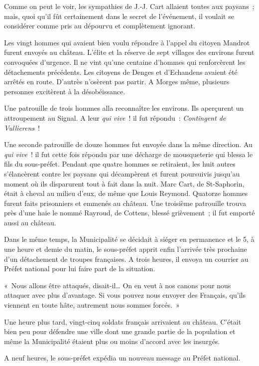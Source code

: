 \documentclass[french,twoside]{book} %
\newenvironment{quoteblock}%
  {\begin{quoting}}
  {\end{quoting}}
\newenvironment{quotebar}{%
    \def\FrameCommand{{\color{rubric!10!}\vrule width 0.5em} \hspace{0.9em}}%
    \def\OuterFrameSep{\itemsep} %
    \MakeFramed {\advance\hsize-\width \FrameRestore}
  }%
  {%
    \endMakeFramed
  }
\renewenvironment{quoteblock}%
  {%
    \savenotes
    \setstretch{0.9}
    \normalfont
    \begin{quotebar}
  }
  {%
    \end{quotebar}
    \spewnotes
  }
\begin{document}
\noindent Comme on peut le voir, les sympathies de J.-J. Cart allaient toutes aux paysans ; mais, quoi qu’il fût certainement dans le secret de l’événement, il voulait se considérer comme pris au dépourvu et complètement ignorant.\par
Les vingt hommes qui avaient bien voulu répondre à l’appel du citoyen Mandrot furent envoyés au château. L’élite et la réserve de sept villages des environs furent convoquées d’urgence. Il ne vint qu’une centaine d’hommes qui renforcèrent les détachements précédents. Les citoyens de Denges et d’Echandens avaient été arrêtés en route. D’autrès n’osèrent pas partir. A Morges même, plusieurs personnes excitèrent à la désobéissance.\par
Une patrouille de trois hommes alla reconnaître les environs. Ils aperçurent un attroupement au Signal. A leur \emph{qui vive} ! il fut répondu : \emph{Contingent de Vullierens} !\par
Une seconde patrouille de douze hommes fut envoyée dans la même direction. Au \emph{qui vive} ! il fut cette fois répondu par une décharge de mousqueterie qui blessa le fils du sous-préfet. Pendant que quatre hommes se retiraient, les huit autres s’élancèrent contre les paysans qui décampèrent et furent poursuivis jusqu’au moment où ils disparurent tout à fait dans la nuit. Marc Cart, de St-Saphorin, était à cheval au milieu d’eux, de même que Louis Reymond. Quatorze hommes furent faits prisonniers et emmenés au château. Une troisième patrouille trouva près d’une haie le nommé Rayroud, de Cottens, blessé grièvement ; il fut emporté aussi au château.\par
Dans le même temps, la Municipalité se décidait à siéger en permanence et le 5, à une heure et demie du matin, le sous-préfet apprit enfin l’arrivée très prochaine d’un détachement de troupes françaises. A trois heures, il envoya un courrier au Préfet national pour lui faire part de la situation.\par

\begin{quoteblock}
 \noindent « Nous allons être attaqués, disait-il… On en veut à nos canons pour nous attaquer avec plus d’avantage. Si vous pouvez nous envoyer des Français, qu’ils viennent en toute hâte, autrement nous sommes forcés. »
 \end{quoteblock}

\noindent Une heure plus tard, vingt-cinq soldats français arrivaient au château. C’était bien peu pour défendre une ville dont une grande partie de la population et même la Municipalité étaient plus ou moins d’accord avec les insurgés.\par
A neuf heures, le sous-préfet expédia un nouveau message au Préfet national.\par
\end{document}
